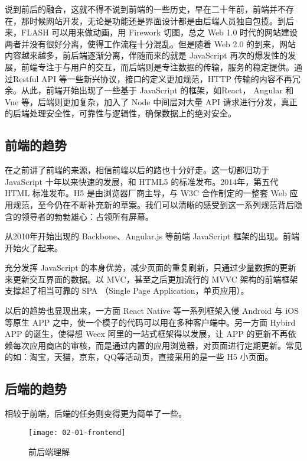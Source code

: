 说到前后的融合，这就不得不说到前端的一些历史，早在二十年前，前端并不存在，那时候网站开发，无论是功能还是界面设计都是由后端人员独自包揽。到后来，FLASH 可以用来做动画，用 Firework 切图，总之 Web 1.0 时代的网站建设两者并没有很好分离，使得工作流程十分混乱。但是随着 Web 2.0 的到来，网站内容越来越多，前后端逐渐分离，伴随而来的就是 JavaScript 再次的爆发性的发展，前端专注于与用户的交互，而后端则是专注数据的传输，服务的稳定提供。通过Restful API 等一些新兴协议，接口的定义更加规范，HTTP 传输的内容不再冗余。从此，前端开始出现了一些基于 JavaScript 的框架，如React， Angular 和 Vue 等，后端则更加复杂，加入了 Node 中间层对大量 API 请求进行分发，真正的后端处理安全性，可靠性与逻辑性，确保数据上的绝对安全。

\subsection{前端的趋势}
\label{sec:requirements}

在之前讲了前端的来源，相信前端以后的路也十分好走。这一切都归功于 JavaScript 十年以来快速的发展，和 HTML5 的标准发布。2014年，第五代 HTML 标准发布。H5 是由浏览器厂商主导，与 W3C 合作制定的一整套 Web 应用规范，至今仍在不断补充新的草案。我们可以清晰的感受到这一系列规范背后隐含的领导者的勃勃雄心：占领所有屏幕。

从2010年开始出现的 Backbone、Angular.js 等前端 JavaScript 框架的出现。前端开始火了起来。

充分发挥 JavaScript 的本身优势，减少页面的重复刷新，只通过少量数据的更新来更新交互界面的数据。以 MVC，甚至之后更加流行的 MVVC 架构的前端框架支撑起了相当可靠的 SPA （Single Page Application，单页应用）。

以后的趋势也显现出来，一方面 React Native 等一系列框架入侵 Android 与 iOS 等原生 APP 之中，使一个模子的代码可以用在多种客户端中。另一方面 Hybird APP 的诞生，使得想 Weex 阿里的一站式框架得以发展，让 APP 的更新不再依赖每次应用商店的审核，而是通过内置的应用浏览器，对页面进行定期更新。常见的如：淘宝，天猫，京东，QQ等活动页，直接采用的是一些 H5 小页面。

\subsection{后端的趋势}
\label{sec:requirements}

相较于前端，后端的任务则变得更为简单了一些。

\begin{figure}[htbp]
\centering
\texttt{[image: 02-01-frontend]}
\caption{前后端理解}
\label{fig:02-01-frontend}
\end{figure}

